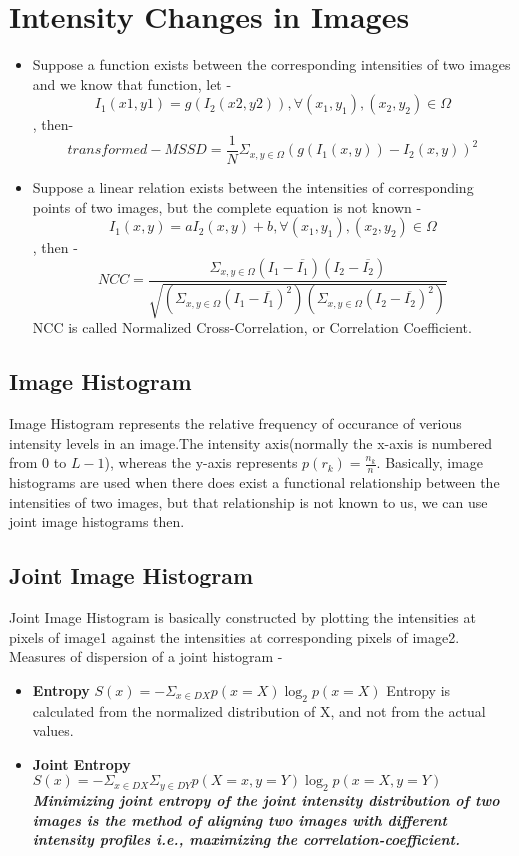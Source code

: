 \documentclass{report}
\begin{document}
\section{Intensity Changes in Images}
\begin{itemize}
    \item Suppose a function exists between the corresponding intensities of two images and we know that function, let - \[ I_1(x1,y1) = g(I_2(x2,y2)), 
    \forall (x_1,y_1),(x_2,y_2) \in \Omega \], then-
    \[ transformed-MSSD = \frac{1}{N}\Sigma_{x,y \in \Omega}(g(I_1(x,y)) - I_2(x,y))^2\]
    \item Suppose a linear relation exists between the intensities of corresponding points of two images, but the complete equation is not known - \[ I_1(x,y) = aI_2(x,y) + b, 
    \forall (x_1,y_1),(x_2,y_2) \in \Omega \], then -
    \[ NCC = \frac{\Sigma_{x,y \in \Omega}(I_1 - \overline{I_1})(I_2 - \overline{I_2})}{\sqrt{(\Sigma_{x,y \in \Omega}(I_1 - \overline{I_1})^2)(\Sigma_{x,y \in \Omega}(I_2 - \overline{I_2})^2)}} \]
    NCC is called Normalized Cross-Correlation, or Correlation Coefficient.
\end{itemize}
\subsection{Image Histogram}
Image Histogram represents the relative frequency of occurance of verious intensity levels in an image.The intensity axis(normally the x-axis is numbered from 0 to $L-1$), whereas the y-axis represents $p(r_k) = \frac{n_k}{n}$.
Basically, image histograms are used when there does exist a functional relationship between the intensities of two images, but that relationship is not known to us, we can use joint image histograms then.
\subsection{Joint Image Histogram}
Joint Image Histogram is basically constructed by plotting the intensities at pixels of image1 against the intensities at corresponding pixels of image2.
Measures of dispersion of a joint histogram -
\begin{itemize}
    \item \textbf{Entropy} $ S(x) = -\Sigma_{x \in DX}p(x=X)\log_2p(x=X)$
    Entropy is calculated from the normalized distribution of X, and not from the actual values.
    \item \textbf{Joint Entropy} $S(x) = -\Sigma_{x \in DX}\Sigma_{y \in DY}p(X=x,y=Y)\log_2p(x=X,y=Y)$ \\
    \textbf{\textit{Minimizing joint entropy of the joint intensity distribution of two images is the method of aligning two images with different intensity profiles i.e., maximizing the correlation-coefficient.}}
\end{itemize}
\end{document}
